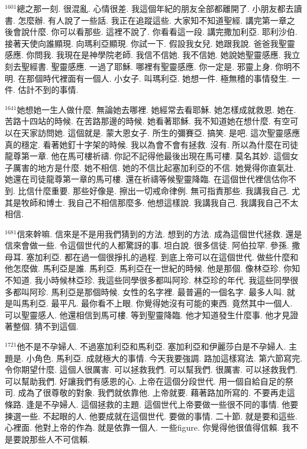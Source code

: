 \documentclass{book}
\begin{document}
$^{1601}$總之那一刻.
很混亂.
心情很差.
我這個年紀的朋友全部都離開了.
小朋友都去讀書.
怎麼辦.
有人說了一些話.
我正在追蹤這些.
大家知不知道聖經.
講完第一章之後會說什麼.
你可以看那些.
這裡不說了.
你看看這一段.
講完撒加利亞.
耶利沙伯.
接著天使向誰顯現.
向瑪利亞顯現.
你試一下.
假設我女兒.
她跟我說.
爸爸我聖靈感應.
你問我.
我現在是神學院老師.
我信不信她.
我不信她.
她說她聖靈感應.
我立刻去聖經書.
聖靈感應.
一過了耶穌.
哪裡有聖靈感應.
你一定是.
邪靈上身.
你明不明.
在那個時代裡面有一個人.
小女子.
叫瑪利亞.
她想一件.
極無稽的事情發生.
一件.
估計不到的事情.

$^{1641}$她想她一生人做什麼.
無論她去哪裡.
她經常去看耶穌.
她怎樣成就救恩.
她在.
苦路十四站的時候.
在苦路那邊的時候.
她看著耶穌.
我不知道她在想什麼.
有空可以在天家訪問她.
這個就是.
蒙大恩女子.
所生的彌賽亞.
搞笑.
是吧.
這次聖靈感應真的穩定.
看著她釘十字架的時候.
我以為會不會有拯救.
沒有.
所以為什麼在司徒龍尊第一章.
他在馬可樓祈禱.
你記不記得他最後出現在馬可樓.
莫名其妙.
這個女子厲害的地方是什麼.
她不相信.
她的不信比起塞加利亞的不信.
她覺得你直氣壯.
她還在司徒龍尊第一章的馬可樓.
還在祈禱等候聖靈降臨.
在這個世代裡信估你不到.
比信什麼重要.
那些好像是.
擦出一切戒命律例.
無可指責那些.
我講我自己.
尤其是牧師和博士.
我自己不相信那麼多.
他想這樣說.
我講我自己.
我講我自己不太相信.

$^{1681}$信來幹嘛.
信來是不是用我們猜到的方法.
想到的方法.
成為這個世代拯救.
還是信來會做一些.
令這個世代的人都驚訝的事.
坦白說.
很多信徒.
阿伯拉罕.
參孫.
撒母耳.
塞加利亞.
都在過一個很掙扎的過程.
到底上帝可以在這個世代.
做些什麼和他怎麼做.
馬利亞是誰.
馬利亞.
馬利亞在一世紀的時候.
他是那個.
像林亞珍.
你知不知道.
我小時候林亞珍.
我這些同學很多都叫阿珍.
林亞珍的年代.
我這些同學很多都叫阿珍.
馬利亞是那個時候.
女性的名字裡.
最普遍的一個名字.
最多人叫.
就是叫馬利亞.
最平凡.
最你看不上眼.
你覺得她沒有可能的東西.
竟然其中一個人.
可以聖靈感人.
他還相信到馬可樓.
等到聖靈降臨.
他才知道發生什麼事.
他才見證著整個.
猜不到這個.

$^{1721}$他不是不孕婦人.
不過塞加利亞和馬利亞.
塞加利亞和伊麗莎白是不孕婦人.
主題是.
小角色.
馬利亞.
成就極大的事情.
今天我要強調.
路加這樣寫法.
第六節寫完.
令你期望什麼.
這個人很厲害.
可以拯救我們.
可以幫我們.
很厲害.
可以拯救我們.
可以幫助我們.
好讓我們有感恩的心.
上帝在這個分段世代.
用一個自給自足的祭司.
成為了很尊敬的對象.
我們就依靠他.
上帝就要.
藉著路加所寫的.
不要再走這條路.
逢是不孕婦人.
這個拯救的主題.
這個世代上帝要做一些很不同的事情.
他要揀選一些.
不起眼的人.
他要成就在這個世代.
要做的事情.
二十節.
就是要和這些.
心裡面.
他對上帝的作為.
就是依靠一個人.
一些figure.
你覺得他很值得信賴.
我不是要說那些人不可信賴.
\end{document}
